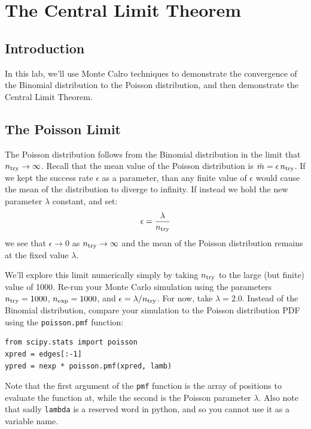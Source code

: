 \chapter{The Central Limit Theorem}

\section{Introduction}

In this lab, we'll use Monte Calro techniques to demonstrate the
convergence of the Binomial distribution to the Poisson distribution,
and then demonstrate the Central Limit Theorem.

\section{The Poisson Limit}

The Poisson distribution follows from the Binomial distribution in the
limit that $n_{\rm try} \to \infty$.  Recall that the mean value of
the Poisson distribution is $\bar{m} = \epsilon \, n_{\rm try}$.  If
we kept the success rate $\epsilon$ as a parameter, than any finite
value of $\epsilon$ would cause the mean of the distribution to diverge to infinity.
If instead we hold the new parameter $\lambda$ constant, and set:
\begin{displaymath}
\epsilon = \frac{\lambda}{n_{\rm try}}
\end{displaymath}
we see that $\epsilon \to 0$ as $n_{\rm try} \to \infty$ and the mean
of the Poisson distribution remains at the fixed value $\lambda$.

We'll explore this limit numerically simply by taking $n_{\rm try}$ to
the large (but finite) value of 1000.  Re-run your Monte Carlo
simulation using the parameters $n_{\rm try} = 1000$, $n_{\rm exp} =
1000$, and $\epsilon = \lambda / n_{\rm try}$.  For now, take $\lambda
= 2.0$.  Instead of the Binomial distribution, compare your simulation to the Poisson distribution PDF
using the {\tt poisson.pmf} function:
\begin{verbatim}
from scipy.stats import poisson
xpred = edges[:-1]
ypred = nexp * poisson.pmf(xpred, lamb) 
\end{verbatim}
Note that the first argument of the {\tt pmf} function is the array of
positions to evaluate the function at, while the second is the Poisson
parameter $\lambda$.  Also note that sadly {\tt lambda} is a reserved word
in python, and so you cannot use it as a variable name.

